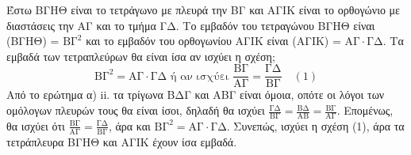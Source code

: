 \begin{alist}
\begin{figure}
        \end{figure}
        Έστω ΒΓΗΘ είναι το τετράγωνο με πλευρά την ΒΓ και ΑΓΙΚ είναι το ορθογώνιο με διαστάσεις την ΑΓ και το τμήμα ΓΔ.
        Το εμβαδόν του τετραγώνου ΒΓΗΘ είναι (ΒΓΗΘ) = $\mathrm{ΒΓ}^2$ και το εμβαδόν του ορθογωνίου ΑΓΙΚ είναι (ΑΓΙΚ) = $\mathrm{ΑΓ} \cdot \mathrm{ΓΔ}$.
        Τα εμβαδά των τετραπλεύρων θα είναι ίσα αν ισχύει η σχέση;
        \[ \mathrm{ΒΓ}^2 = \mathrm{ΑΓ} \cdot \mathrm{ΓΔ} \text{ ή αν ισχύει } \frac{\mathrm{ΒΓ}}{\mathrm{ΑΓ}} = \frac{\mathrm{ΓΔ}}{\mathrm{ΒΓ}} \quad (1) \]
        Από το ερώτημα α) ii. τα τρίγωνα ΒΔΓ και ΑΒΓ είναι όμοια, οπότε οι λόγοι των ομόλογων πλευρών τους θα είναι ίσοι, δηλαδή θα ισχύει $\frac{\mathrm{ΓΔ}}{\mathrm{ΒΓ}} = \frac{\mathrm{ΒΔ}}{\mathrm{ΑΒ}} = \frac{\mathrm{ΒΓ}}{\mathrm{ΑΓ}}$. Επομένως, θα ισχύει ότι $\frac{\mathrm{ΒΓ}}{\mathrm{ΑΓ}} = \frac{\mathrm{ΓΔ}}{\mathrm{ΒΓ}}$, άρα και $\mathrm{ΒΓ}^2 = \mathrm{ΑΓ} \cdot \mathrm{ΓΔ}$.
        Συνεπώς, ισχύει η σχέση (1), άρα τα τετράπλευρα ΒΓΗΘ και ΑΓΙΚ έχουν ίσα εμβαδά.
\end{alist}